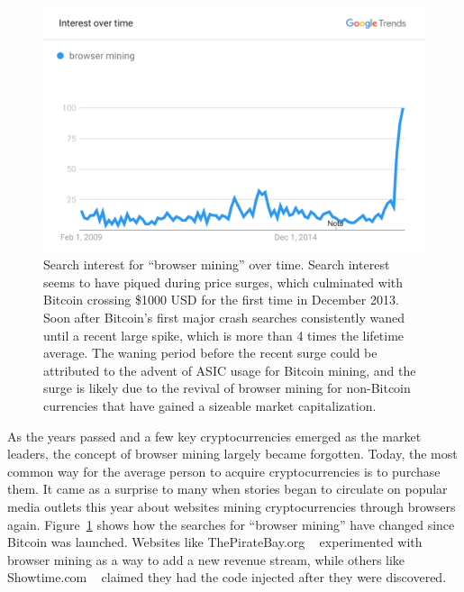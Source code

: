 \begin{figure}[t]
\centering
\includegraphics[width=0.9\linewidth]{figures/browser_mining.png}
\caption{Search interest for ``browser mining'' over time. Search interest seems to have piqued during price surges, which culminated with Bitcoin crossing \$1000 USD for the first time in December 2013. Soon after Bitcoin's first major crash searches consistently waned until a recent large spike, which is more than 4 times the lifetime average. The waning period before the recent surge could be attributed to the advent of ASIC usage for Bitcoin mining, and the surge is likely due to the revival of browser mining for non-Bitcoin currencies that have gained a sizeable market capitalization.\label{fig:interest}}
\end{figure}

As the years passed and a few key cryptocurrencies emerged as the market leaders, the concept of browser mining largely became forgotten. Today, the most common way for the average person to acquire cryptocurrencies is to purchase them. It came as a surprise to many when stories began to circulate on popular media outlets this year about websites mining cryptocurrencies through browsers again. Figure~\ref{fig:interest} shows how the searches for ``browser mining'' have changed since Bitcoin was launched. Websites like ThePirateBay.org ~\cite{piratesbayhive} experimented with browser mining as a way to add a new revenue stream, while others like Showtime.com ~\cite{showtimehive} claimed they had the code injected after they were discovered. 

